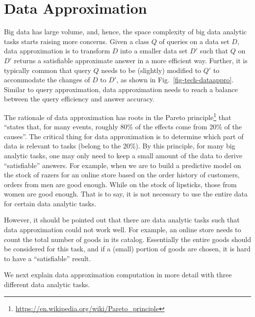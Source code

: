\section{Data Approximation}
\label{sec-data}






Big data has large volume, and, hence, the space complexity of big data analytic tasks starts raising more concerns.
Given a class $Q$ of queries on a data set $D$, data approximation is to transform $D$ into a smaller data set $D'$ such that $Q$ on $D'$ returns a satisfiable approximate answer in a more efficient way. Further, it is typically common that query $Q$ needs to be (slightly) modified to $Q'$ to accommodate  the changes of $D$ to $D'$, as shown in Fig.~\ref{fig-tech-dataappro}. Similar to query approximation, data approximation needs to reach a balance between the query efficiency and answer accuracy.


The rationale of data approximation has roots in the Pareto principle\footnote{\small \url{https://en.wikipedia.org/wiki/Pareto_principle}} that ``states that, for many events, roughly 80\% of the effects come from 20\% of the causes''. The critical thing for data approximation is to determine which part of data is relevant to tasks (belong to the 20\%).
 By this principle, for many big analytic tasks, one may only need to keep a small amount of the data to derive ``satisfiable'' answers.
For example, when we are to build a predictive model on the stock of razers for an online store based on the order history of customers, orders from men are good enough. While on the stock of lipsticks, those from women are good enough. That is to say,  it is not necessary to use the entire data for certain data analytic tasks.



However, it should be pointed out that there are data analytic tasks such that data approximation could not work well. For example, an online store needs to count the total number of goods in its catalog.  Essentially the entire goods should be considered for this task, and if a (small) portion of goods are chosen, it is hard to have a ``satisfiable'' result.


We next explain data approximation computation in more detail with three different data analytic tasks.



